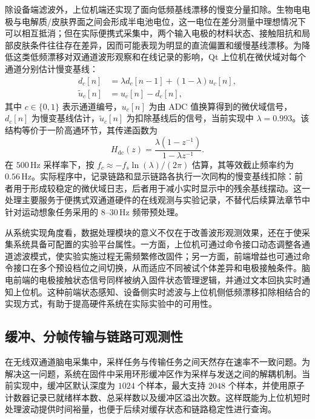 除设备端滤波外，上位机端还实现了面向低频基线漂移的慢变分量扣除。生物电电极与电解质/皮肤界面之间会形成半电池电位，这一电位在差分测量中理想情况下可以相互抵消；但在实际便携式采集中，两个输入电极的材料状态、接触阻抗和局部皮肤条件往往存在差异，因而可能表现为明显的直流偏置和缓慢基线漂移\cite{usakli2010eeg_frontend}。为降低这类低频漂移对双通道波形观察和在线记录的影响，Qt 上位机在微伏域对每个通道分别估计慢变基线：
\begin{equation}
\begin{aligned}
d_c[n] &= \lambda d_c[n-1]+(1-\lambda)u_c[n],\\
\tilde{u}_c[n] &= u_c[n]-d_c[n],
\end{aligned}
\label{eq:c3_dc_blocker}
\end{equation}
其中 $c\in\{0,1\}$ 表示通道编号，$u_c[n]$ 为由 ADC 值换算得到的微伏域信号，$d_c[n]$ 为慢变基线估计，$\tilde{u}_c[n]$ 为扣除基线后的信号，当前实现中 $\lambda=0.993$。该结构等价于一阶高通环节，其传递函数为
\begin{equation}
H_{\mathrm{dc}}(z)=\frac{\lambda(1-z^{-1})}{1-\lambda z^{-1}}.
\label{eq:c3_dc_transfer}
\end{equation}
在 $500\,\mathrm{Hz}$ 采样率下，按 $f_c\approx -f_s\ln(\lambda)/(2\pi)$ 估算，其等效截止频率约为 $0.56\,\mathrm{Hz}$。实际程序中，记录链路和显示链路各执行一次同构的慢变基线扣除：前者用于形成较稳定的微伏域日志，后者用于减小实时显示中的残余基线摆动。这一处理主要服务于便携式双通道硬件的在线观测与实验记录，不替代后续算法章节中针对运动想象任务采用的 $8$--$30\,\mathrm{Hz}$ 频带预处理。

从系统实现角度看，数据处理模块的意义不仅在于改善波形观测效果，还在于使采集系统具备可配置的实验平台属性。一方面，上位机可通过命令接口动态调整各通道滤波模式，使实验实施过程无需频繁修改固件；另一方面，前端增益也可通过命令接口在多个预设档位之间切换，从而适应不同被试个体差异和电极接触条件。脑电前端的电极接触状态信号同样被纳入固件状态管理逻辑，并通过文本回执实时通知上位机。这种前端状态感知、设备侧实时滤波与上位机侧低频漂移扣除相结合的实现方式，有助于提高硬件系统在实际实验中的可用性。

\subsection{缓冲、分帧传输与链路可观测性}

在无线双通道脑电采集中，采样任务与传输任务之间天然存在速率不一致问题。为解决这一问题，系统在固件中采用环形缓冲区作为采样与发送之间的解耦机制。当前实现中，缓冲区默认深度为 $1024$ 个样本，最大支持 $2048$ 个样本，并使用原子计数器记录已就绪样本数、总采样数以及缓冲区溢出次数。这样既能为上位机短时处理波动提供时间裕量，也便于后续对缓存状态和链路稳定性进行查询。

